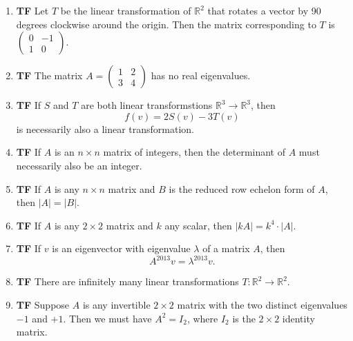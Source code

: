 \documentclass[10pt]{article}
\newcommand{\tf}[1]{\item {\bf {\color{blue}\hspace{1em}T\hspace{1em}F}}\hspace{1em} #1}
\begin{document}
\begin{enumerate}
\tf{Let $T$ be the linear transformation of $\mathbb{R}^2$ that rotates a vector by 90 degrees clockwise around the origin.  Then the matrix corresponding to $T$ is $\left(\begin{array}{rr}
0 & -1 \\
1 & 0
\end{array}\right)$.}

\tf{The matrix $A=\left(\begin{array}{rr}
1 & 2 \\
3 & 4
\end{array}\right)$ has no real eigenvalues.}

\tf{If $S$ and $T$ are both linear transformstions $\mathbb{R}^3\to \mathbb{R}^3$, then  $$f(v) = 2S(v) - 3T(v)$$ is necessarily also a linear transformation.}

\tf{If $A$ is an $n\times n$ matrix of integers, then the determinant of $A$ must necessarily also be an integer.}

\tf{If $A$ is any $n\times n$ matrix and $B$ is the reduced row echelon form of $A$, then  $|A|=|B|$.}

\tf{If $A$ is any $2\times 2$ matrix and $k$ any scalar, then $|kA| = k^4\cdot |A|$.}

\tf{If $v$ is an eigenvector with eigenvalue $\lambda$ of a matrix $A$, then
 $$A^{2013}v = \lambda^{2013} v.$$}

\tf{There are infinitely many linear transformations $T:\mathbb{R}^2\to \mathbb{R}^2$.}

\tf{Suppose $A$ is any invertible $2\times 2$ matrix with the two distinct eigenvalues $-1$ and $+1$.
Then we must have $A^2=I_2$, where $I_2$ is the $2\times 2$ identity matrix.}

\end{enumerate}
\end{document}

